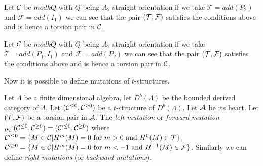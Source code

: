 \begin{example}
Let $\mathcal{C}$ be $mod kQ$ with $Q$ being $A_2$ straight orientation if we take $\mathcal{T} = add(P_2)$ and $\mathcal{F} = add(I_1)$ we can see that the pair $(\mathcal{T},\mathcal{F})$ satisfies the conditions above and is hence a torsion pair in $\mathcal{C}$.
\end{example}
\begin{example}
Let $\mathcal{C}$ be $mod kQ$ with $Q$ being $A_2$ straight orientation if we take $\mathcal{T} = add(P_1,I_1)$ and $\mathcal{F} = add(P_2)$ we can see that the pair $(\mathcal{T},\mathcal{F})$ satisfies the conditions above and is hence a torsion pair in $\mathcal{C}$.
\end{example}
\indent Now it is possible to define mutations of $t$-structures.
\begin{definition}
\cite{KY12}Let $\Lambda$ be a finite dimensional algebra, let $D^b(\Lambda)$ be the bounded derived category of $\Lambda$. Let $(\mathcal{C}^{\leq 0},\mathcal{C}^{\geq 0})$ be a $t$-structure of $D^b(\Lambda)$. Let $\mathcal{A}$ be its heart. Let $(\mathcal{T},\mathcal{F})$ be a torsion pair in $\mathcal{A}$. The \textit{left mutation} or \textit{forward mutation} $\mu_i^+(\mathcal{C}^{\leq 0},\mathcal{C}^{\geq 0}) = (\mathcal{C}'^{\leq 0},\mathcal{C}^{\geq 0})$  where $\mathcal{C}'^{\leq 0} = \{M\in\mathcal{C}| H^m(M) = 0 \text{ for } m>0 \text{ and } H^0(M)\in\mathcal{T}\}$, $\mathcal{C}'^{\geq 0} = \{M\in\mathcal{C}| H^m(M) = 0 \text{ for } m<-1 \text{ and } H^{-1}(M)\in\mathcal{F}\}$. Similarly we can define \textit{right mutations} (or \textit{backward mutations}). 
\end{definition}
